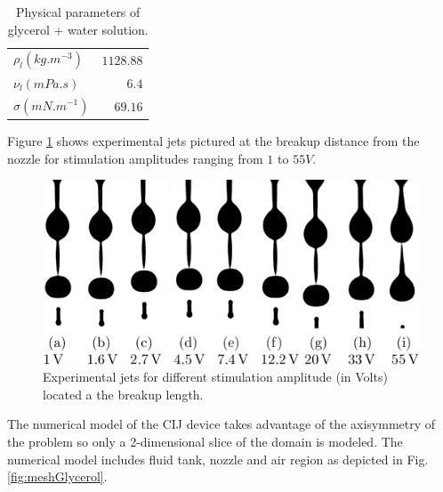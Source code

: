 \documentclass[onecolumn, 12pt]{asme2ej}
\begin{document}
\begin{table}
    \begin{center}
        \begin{tabular}{lr}
            \hline
            $\rho_{l} (kg.m^{-3})$ & $1128.88$\\
            $\nu_{l} (mPa.s)$ & $6.4$\\
            $\sigma (mN.m^{-1})$ & $69.16$\\
            \hline
        \end{tabular}
    \end{center}
    
    \caption{\label{tab:parametersGlycerol} Physical parameters of glycerol + water solution.}
\end{table}

Figure \ref{fig:glycerolCIJExp} shows experimental jets pictured at the breakup distance from the nozzle for stimulation amplitudes ranging from $1$ to $55V$.

\begin{figure}[t]
    \centering
    \includegraphics[width=15cm]{Figures/Fig7.eps}
    \caption{Experimental jets for different stimulation amplitude (in Volts) located a the breakup length.}
    \label{fig:glycerolCIJExp}
\end{figure}

The numerical model of the CIJ device takes advantage of the axisymmetry of the problem so only a 2-dimensional slice of the domain is modeled. The numerical model includes fluid tank, nozzle and air region as depicted in Fig. \ref{fig:meshGlycerol}. 
\end{document}
